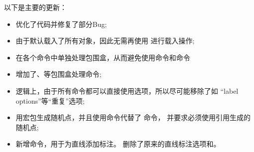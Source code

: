 \documentclass[../main.tex]{subfiles}
\begin{document}
以下是主要的更新：
\vspace{1cm}
\begin{itemize}\setlength{\itemsep}{10pt}

\item 优化了代码并修复了部分Bug;

\item 由于默认载入了所有对象，因此无需再使用
进行载入操作;

\item 在各个命令中单独处理包围盒，从而避免使用命令和命令

\item 增加了、等包围盒处理命令;
\item 逻辑上，由于所有命令都可以直接使用\TIKZ{}选项，所以尽可能移除了如
\enquote{label options}等\enquote{重复}选项;

\item 用\tkzname{\tkznameofpack}宏包生成随机点，并且使用命令代替了
命令，
并要求必须使用引用生成的随机点;

\item 新增命令，用于为直线添加标注。
删除了原来的直线标注选项和。


\end{itemize}
\end{document}
